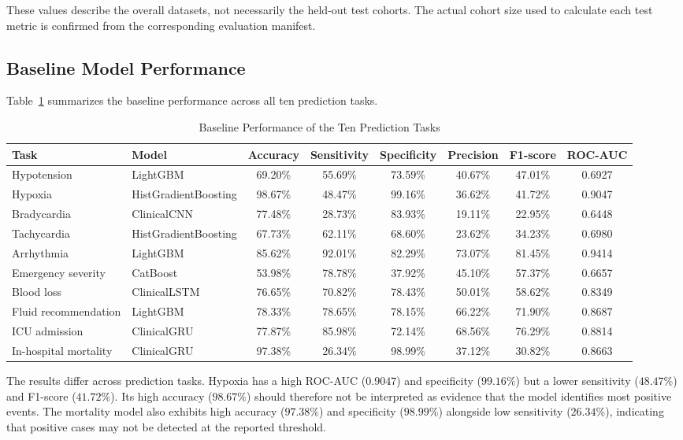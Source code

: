 \documentclass[conference]{IEEEtran}
\begin{document}
These values describe the overall datasets, not necessarily the held-out test cohorts. The actual cohort size used to calculate each test metric is confirmed from the corresponding evaluation manifest.

\subsection{Baseline Model Performance}
Table~\ref{tab:baseline_perf} summarizes the baseline performance across all ten prediction tasks.

\begin{table}[t]
\centering
\caption{Baseline Performance of the Ten Prediction Tasks}
\label{tab:baseline_perf}
\begin{tabularx}{\textwidth}{l l c c c c c c}
\toprule
\textbf{Task} & \textbf{Model} & \textbf{Accuracy} & \textbf{Sensitivity} & \textbf{Specificity} & \textbf{Precision} & \textbf{F1-score} & \textbf{ROC-AUC} \\
\midrule
Hypotension & LightGBM & 69.20\% & 55.69\% & 73.59\% & 40.67\% & 47.01\% & 0.6927 \\
Hypoxia & HistGradientBoosting & 98.67\% & 48.47\% & 99.16\% & 36.62\% & 41.72\% & 0.9047 \\
Bradycardia & ClinicalCNN & 77.48\% & 28.73\% & 83.93\% & 19.11\% & 22.95\% & 0.6448 \\
Tachycardia & HistGradientBoosting & 67.73\% & 62.11\% & 68.60\% & 23.62\% & 34.23\% & 0.6980 \\
Arrhythmia & LightGBM & 85.62\% & 92.01\% & 82.29\% & 73.07\% & 81.45\% & 0.9414 \\
Emergency severity & CatBoost & 53.98\% & 78.78\% & 37.92\% & 45.10\% & 57.37\% & 0.6657 \\
Blood loss & ClinicalLSTM & 76.65\% & 70.82\% & 78.43\% & 50.01\% & 58.62\% & 0.8349 \\
Fluid recommendation & LightGBM & 78.33\% & 78.65\% & 78.15\% & 66.22\% & 71.90\% & 0.8687 \\
ICU admission & ClinicalGRU & 77.87\% & 85.98\% & 72.14\% & 68.56\% & 76.29\% & 0.8814 \\
In-hospital mortality & ClinicalGRU & 97.38\% & 26.34\% & 98.99\% & 37.12\% & 30.82\% & 0.8663 \\
\bottomrule
\end{tabularx}
\end{table}

The results differ across prediction tasks. Hypoxia has a high ROC-AUC ($0.9047$) and specificity ($99.16\%$) but a lower sensitivity ($48.47\%$) and F1-score ($41.72\%$). Its high accuracy ($98.67\%$) should therefore not be interpreted as evidence that the model identifies most positive events. The mortality model also exhibits high accuracy ($97.38\%$) and specificity ($98.99\%$) alongside low sensitivity ($26.34\%$), indicating that positive cases may not be detected at the reported threshold.
\end{document}
